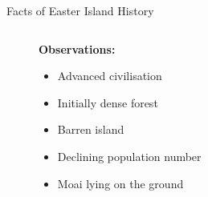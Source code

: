 \begin{frame}{Facts of Easter Island History}
\begin{figure}
{\begin{columns}
\begin{column}{0.4\textwidth}
				\textbf{Observations:} \vspace{0.2cm}
			\begin{itemize}
				\item Advanced civilisation 
				\item Initially dense forest
				\item Barren island
				\item Declining population number
				\item Moai lying on the ground
			\end{itemize}
			\end{column}
		\end{columns}
	}


\end{figure}
\end{frame}
